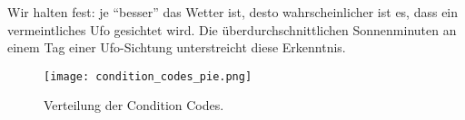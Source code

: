 Wir halten fest: je \enquote{besser} das Wetter ist, desto wahrscheinlicher ist es, dass ein vermeintliches Ufo gesichtet wird. Die überdurchschnittlichen Sonnenminuten an einem Tag einer Ufo-Sichtung unterstreicht diese Erkenntnis.

\begin{figure}[t]
    \centering
    \texttt{[image: condition\_codes\_pie.png]}
    \caption{Verteilung der Condition Codes.}
    \label{fig:coco_pie}
\end{figure}
